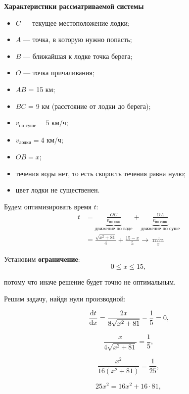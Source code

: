 \textbf{Характеристики рассматриваемой системы}
\begin{itemize}[nosep]
	\item $C$ --- текущее местоположение лодки;
	
	\item $A$ --- точка, в которую нужно попасть;
	
	\item $B$ --- ближайшая к лодке точка берега;
	
	\item $O$ --- точка причаливания;
	
	\item $AB$ = 15 км;
	
	\item $BC$ = 9 км (расстояние от лодки до берега);
	
	\item $v_{\text{по суше}} = 5$ км/ч;
	
	\item $v_{\text{лодки}} = 4$ км/ч;
		
	\item $OB = x$;
	
	\item течения воды нет, то есть скорость течения равна нулю;
	
	\item цвет лодки не существенен.
\end{itemize}

\bigskip

Будем оптимизировать время $t$:
\begin{align*}
	t &= \underbrace{\frac{OC}{v_{\text{по воде}}}}_{\text{движение по воде}} + \underbrace{\frac{OA}{v_{\text{по суше}}}}_{\text{движение по суше}} \\
	&= \boxed{\frac{\sqrt{x^2+81}}{4} + \frac{15 - x}{5} \to \min_x}
\end{align*}

Установим \textbf{ограничение}:
\[
	0 \le x \le 15,
\]

потому что иначе решение будет точно не оптимальным.

\bigskip

Решим задачу, найдя нули производной:

\[\derivative{t}{x} = \frac{2x}{8\sqrt{x^2+81}} - \frac{1}{5} = 0,\]

\[\frac{x}{4\sqrt{x^2+81}} = \frac{1}{5},\]

\[\frac{x^2}{16(x^2 + 81)} = \frac{1}{25},\]

\[	25x^2 = 16x^2 + 16 \cdot 81,\]

